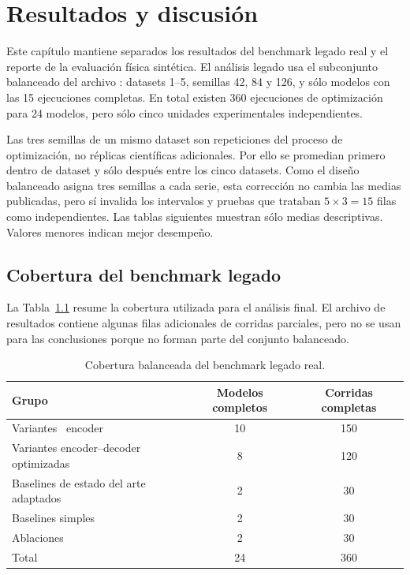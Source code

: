 \chapter{Resultados y discusión}
\label{cap:resultados}

Este capítulo mantiene separados los resultados del benchmark legado real y el reporte de la evaluación física sintética. El análisis legado usa el subconjunto balanceado del archivo : datasets 1--5, semillas 42, 84 y 126, y sólo modelos con las 15 ejecuciones completas. En total existen 360 ejecuciones de optimización para 24 modelos, pero sólo cinco unidades experimentales independientes.

\hfill

Las tres semillas de un mismo dataset son repeticiones del proceso de optimización, no réplicas científicas adicionales. Por ello se promedian primero dentro de dataset y sólo después entre los cinco datasets. Como el diseño balanceado asigna tres semillas a cada serie, esta corrección no cambia las medias publicadas, pero sí invalida los intervalos y pruebas que trataban $5\times3=15$ filas como independientes. Las tablas siguientes muestran sólo medias descriptivas. Valores menores indican mejor desempeño.

\section{Cobertura del benchmark legado}
\label{sec:cobertura-benchmark-final}

La Tabla~\ref{tab:cobertura-final} resume la cobertura utilizada para el análisis final. El archivo de resultados contiene algunas filas adicionales de corridas parciales, pero no se usan para las conclusiones porque no forman parte del conjunto balanceado.

\begin{table}[H]
	\centering
	\caption{Cobertura balanceada del benchmark legado real.}
	\label{tab:cobertura-final}
	\begin{tabular}{lcc}
		\toprule
		Grupo & Modelos completos & Corridas completas \\
		\midrule
		Variantes \CTTransformer\ encoder & 10 & 150 \\
		Variantes encoder--decoder optimizadas & 8 & 120 \\
		Baselines de estado del arte adaptados & 2 & 30 \\
		Baselines simples & 2 & 30 \\
		Ablaciones & 2 & 30 \\
		\midrule
		Total & 24 & 360 \\
		\bottomrule
	\end{tabular}
\end{table}

